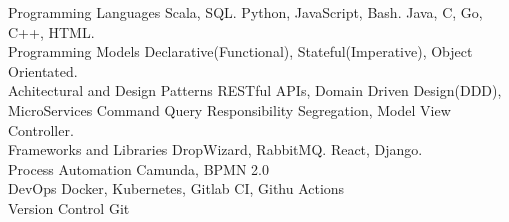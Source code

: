 

\begin{cvskills}
  \cvskill
    {Programming Languages} %
    {  Scala, SQL.} 
  \cvskill
    {} %
    {  Python, JavaScript, Bash. } 
  \cvskill
    {} %
    {  Java, C, Go, C++, HTML.} 
  \\
  \cvskill
    {Programming Models} %
    { Declarative(Functional), Stateful(Imperative), Object Orientated.} 
  \\
  \cvskill
    {Achitectural and Design Patterns} %
    {  RESTful APIs, Domain Driven Design(DDD), MicroServices}
    \cvskill
    {} %
    {  Command Query Responsibility Segregation, Model View Controller.} 
  \\
  \cvskill
    {Frameworks and Libraries} %
    {  DropWizard, RabbitMQ.} 
  \cvskill
    {} %
    {  React, Django.} 
  \\
  \cvskill
    {Process Automation}
    { Camunda, BPMN 2.0}
  \\
  \cvskill
    {DevOps} %
    { Docker, Kubernetes, Gitlab CI, Githu Actions} %
  \\
  \cvskill
  {Version Control} %
  { Git} %

\end{cvskills}
